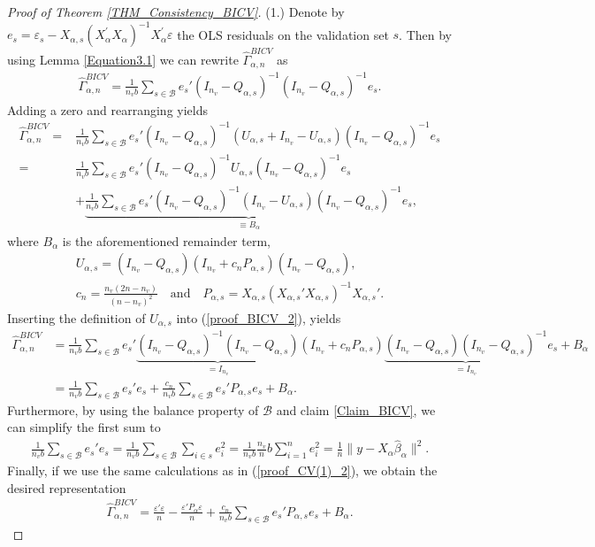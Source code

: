 \documentclass[Research_Module_ES.tex]{subfiles}
\begin{document}
\begin{proof}[Proof of Theorem \ref{THM_Consistency_BICV}]
	(1.) Denote by $e_s=\varepsilon_s-X_{\alpha,s}(X_\alpha^\prime X_\alpha)^{-1}X_\alpha^\prime\varepsilon$ the OLS residuals on the validation set $s$. Then by using Lemma \ref{Equation3.1} we can rewrite $\hat{\Gamma}_{\alpha,n}^{BICV}$ as
	\begin{align*}
	\hat{\Gamma}_{\alpha,n}^{BICV} = \frac{1}{n_vb}\sum_{s\in \mathcal{B}}e_s'(I_{n_v}-Q_{\alpha,s})^{-1}(I_{n_v}-Q_{\alpha,s})^{-1}e_s.
	\end{align*}
	Adding a zero and rearranging yields
	\begin{align}
	\hat{\Gamma}_{\alpha,n}^{BICV} = &\frac{1}{n_vb}\sum_{s\in \mathcal{B}}e_s'(I_{n_v}-Q_{\alpha,s})^{-1}(U_{\alpha,s} + I_{n_v}-U_{\alpha,s})(I_{n_v}-Q_{\alpha,s})^{-1}e_s\nonumber\\
	= &\frac{1}{n_vb}\sum_{s\in \mathcal{B}}e_s'(I_{n_v}-Q_{\alpha,s})^{-1}U_{\alpha,s}(I_{n_v}-Q_{\alpha,s})^{-1}e_s\label{proof_BICV_2}\\
	&+\underbrace{\frac{1}{n_vb}\sum_{s\in \mathcal{B}}e_s'(I_{n_v}-Q_{\alpha,s})^{-1}(I_{n_v}-U_{\alpha,s})(I_{n_v}-Q_{\alpha,s})^{-1}e_s}_{\equiv B_\alpha},\nonumber
	\end{align}
	where $B_\alpha$ is the aforementioned remainder term, 
	\begin{align*}
	U_{\alpha,s}=(I_{n_v}-Q_{\alpha,s})(I_{n_v}+c_n P_{\alpha,s})(I_{n_v}-Q_{\alpha,s}),\\
	c_n = \frac{n_v(2n-n_v)}{(n-n_v)^2}\quad \textrm{and} \quad
	P_{\alpha,s}= X_{\alpha,s}(X_{\alpha,s}'X_{\alpha,s})^{-1}X_{\alpha,s}'.
	\end{align*}
	Inserting the definition of $U_{\alpha,s}$ into (\ref{proof_BICV_2}), yields
	\begin{align*}
	\hat{\Gamma}_{\alpha,n}^{BICV}&=\frac{1}{n_vb}\sum_{s\in \mathcal{B}}e_s'\underbrace{(I_{n_v}-Q_{\alpha,s})^{-1}(I_{n_v}-Q_{\alpha,s})}_{=I_{n_v}}(I_{n_v}+c_n P_{\alpha,s})\underbrace{(I_{n_v}-Q_{\alpha,s})(I_{n_v}-Q_{\alpha,s})^{-1}}_{=I_{n_v}}e_s +B_\alpha\\
	&=\frac{1}{n_vb}\sum_{s\in \mathcal{B}}e_s'e_s + \frac{c_n}{n_vb}\sum_{s\in \mathcal{B}}e_s'P_{\alpha,s}e_s+B_\alpha.
	\end{align*}
	Furthermore, by using the balance property of $\mathcal{B}$ and claim \ref{Claim_BICV}, we can simplify the first sum to
	\begin{align*}
	\frac{1}{n_vb}\sum_{s\in \mathcal{B}}e_s'e_s
	= \frac{1}{n_vb}\sum_{s\in \mathcal{B}}\sum_{i\in s}e_i^2 
	= \frac{1}{n_vb}\frac{n_v}{n}b \sum_{i=1}^ne_i^2 = \frac{1}{n}\lVert y-X_\alpha\hat{\beta}_\alpha\rVert^2.
	\end{align*}
	Finally, if we use the same calculations as in (\ref{proof_CV(1)_2}), we obtain the desired representation
	\begin{align*}
	\hat{\Gamma}_{\alpha,n}^{BICV} = \frac{\varepsilon'\varepsilon}{n}-\frac{\varepsilon'P_\alpha\varepsilon}{n}+\frac{c_n}{n_v b}\sum_{s\in \mathcal{B}}e_s'P_{\alpha,s}e_s+B_\alpha.
	\end{align*}
	

\end{proof}
\end{document}
